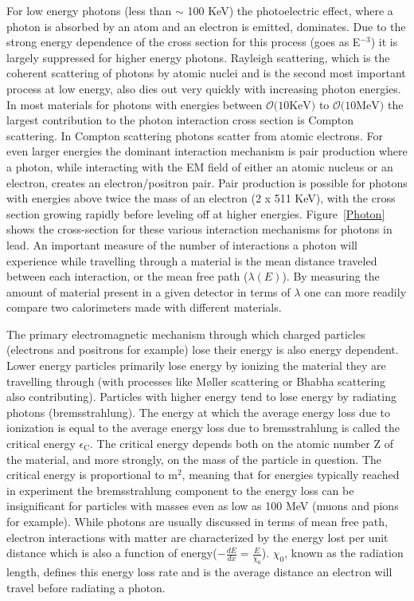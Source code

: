 For low energy photons (less than $\sim$ 100 KeV) the photoelectric effect, where a photon is absorbed by an atom and an electron is emitted, dominates.  
Due to the strong energy dependence of the cross section for this process (goes as E$^{-3}$) it is largely suppressed for higher energy photons.   
Rayleigh scattering, which is the coherent scattering of photons by atomic nuclei and is the second most important process at low energy, also dies out very quickly with increasing photon energies.  
In most materials for photons with energies between $\mathcal{O}\mathrm(10 \mathrm{KeV})$ to $\mathcal{O}\mathrm(10 \mathrm{MeV})$ the largest contribution to the photon interaction cross section is Compton scattering.  
In Compton scattering photons scatter from atomic electrons.  
For even larger energies the dominant interaction mechanism is pair production where a photon, while interacting with the EM field of either an atomic nucleus or an electron, creates an electron/positron pair.  
Pair production is possible for photons with energies above twice the mass of an electron (2 x 511 KeV), with the cross section growing rapidly before leveling off at higher energies.  
Figure~\ref{Photon} shows the cross-section for these various interaction mechanisms for photons in lead.  
An important measure of the number of interactions a photon will experience while travelling through a material is the mean distance traveled between each interaction, or the mean free path ($\lambda\left(E\right)$).  
By measuring the amount of material present in a given detector in terms of $\lambda$ one can more readily compare two calorimeters made with different materials.  


The primary electromagnetic mechanism through which charged particles (electrons and positrons for example) lose their energy is also energy dependent.  
Lower energy particles primarily lose energy by ionizing the material they are travelling through (with processes like M{\o}ller scattering or Bhabha scattering also contributing).  
Particles with higher energy tend to lose energy by radiating photons (bremsstrahlung).  
The energy at which the average energy loss due to ionization is equal to the average energy loss due to bremsstrahlung is called the critical energy $\epsilon_{\mathrm{C}}$.  
The critical energy depends both on the atomic number Z of the material, and more strongly, on the mass of the particle in question.  
The critical energy is proportional to m$^2$, meaning that for energies typically reached in experiment the bremsstrahlung component to the energy loss can be insignificant for particles with masses even as low as 100 MeV (muons and pions for example).  
While photons are usually discussed in terms of mean free path, electron interactions with matter are characterized by the energy lost per unit distance which is also a function of energy($-\frac{dE}{dx}=\frac{E}{\chi_{0}}$).  
$\chi_{0}$, known as the radiation length, defines this energy loss rate and is the average distance an electron will travel before radiating a photon.  

